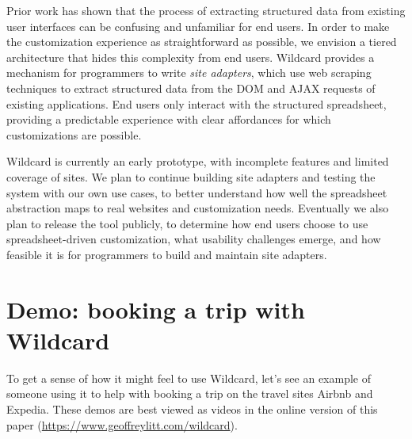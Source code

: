 \documentclass[english,submission]{programming}
\begin{document}
Prior work \autocite{huynh2006} has shown that the process of extracting
structured data from existing user interfaces can be confusing and
unfamiliar for end users. In order to make the customization experience
as straightforward as possible, we envision a tiered architecture that
hides this complexity from end users. Wildcard provides a mechanism for
programmers to write \emph{site adapters}, which use web scraping
techniques to extract structured data from the DOM and AJAX requests of
existing applications. End users only interact with the structured
spreadsheet, providing a predictable experience with clear affordances
for which customizations are possible.

Wildcard is currently an early prototype, with incomplete features and
limited coverage of sites. We plan to continue building site adapters
and testing the system with our own use cases, to better understand how
well the spreadsheet abstraction maps to real websites and customization
needs. Eventually we also plan to release the tool publicly, to
determine how end users choose to use spreadsheet-driven customization,
what usability challenges emerge, and how feasible it is for programmers
to build and maintain site adapters.

\hypertarget{demo-booking-a-trip-with-wildcard}{%
\section{Demo: booking a trip with
Wildcard}\label{demo-booking-a-trip-with-wildcard}}

To get a sense of how it might feel to use Wildcard, let's see an
example of someone using it to help with booking a trip on the travel
sites Airbnb and Expedia.{ These demos are best viewed as videos in the
online version of this paper
(\url{https://www.geoffreylitt.com/wildcard}).}
\end{document}
